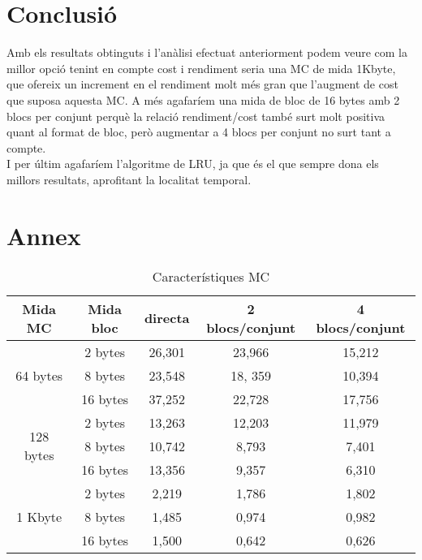 \documentclass{article}
\begin{document}
\section{Conclusió}
Amb els resultats obtinguts i l'anàlisi efectuat anteriorment podem veure com la millor opció tenint en compte cost
 i rendiment seria una MC de mida 1Kbyte, que ofereix un increment en el rendiment molt més gran que l'augment
 de cost que suposa aquesta MC. A més agafaríem una mida de bloc de 16 bytes amb 2 blocs per conjunt perquè
 la relació rendiment/cost també surt molt positiva quant al format de bloc, però augmentar a 4 blocs per conjunt 
no surt tant a compte.\\
I per últim agafaríem l'algoritme de LRU, ja que és el que sempre dona els millors resultats, aprofitant la localitat temporal.
\newpage
\section{Annex}
\begin{table}[!h]
\centering
\begin{tabular}{ |c|c|c|c|c| }
\hline
Mida MC& Mida bloc& directa& 2 blocs/conjunt& 4 blocs/conjunt \\
\hline
\multirow{3}{4em}{64 bytes} & 2 bytes & 26,301 & 23,966 & 15,212 \\
& 8 bytes & 23,548 & 18, 359 & 10,394 \\
& 16 bytes & 37,252 & 22,728 & 17,756 \\
\hline
\multirow{3}{4em}{128 bytes} & 2 bytes & 13,263 & 12,203 & 11,979 \\
& 8 bytes & 10,742 & 8,793 & 7,401 \\
& 16 bytes & 13,356 & 9,357 & 6,310 \\
\hline
\multirow{3}{4em}{1 Kbyte} & 2 bytes & 2,219 & 1,786 & 1,802 \\
& 8 bytes & 1,485 & 0,974 & 0,982 \\
& 16 bytes & 1,500 & 0,642 & 0,626 \\
\hline
\end{tabular}
\caption{Característiques MC}
\label{tab:mc}
\end{table}
\end{document}
